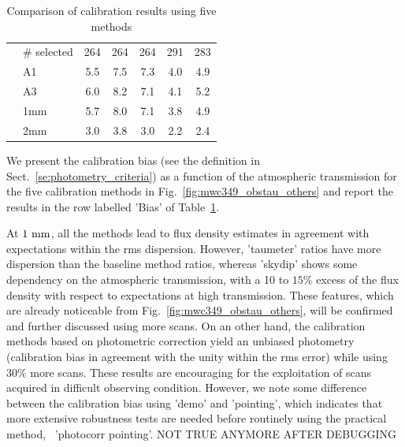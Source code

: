 \begin{table}[th]
\begin{center}
\begin{tabular}{|c|l|c|c|c|c|c|}
       &  $\#$ selected &   264    &    264   &    264    &    291    &  283 \\
       &  A1            &   5.5    &    7.5   &    7.3    &    4.0    &  4.9 \\
       &  A3            &   6.0    &    8.2   &    7.1    &    4.1    &  5.2 \\
       &  1mm           &   5.7    &    8.0   &    7.1    &    3.8    &  4.9 \\
       &  2mm           &   3.0    &    3.8   &    3.0    &    2.2    &  2.4 \\
\hline\hline
\end{tabular}
\caption[Comparison of calibration results using five methods]{Comparison of calibration results using five methods}
\label{tab:Calibration_results_all}
\end{center}
\end{table}

We present the calibration bias (see the definition in
Sect.~\ref{se:photometry_criteria}) as a function of the atmospheric
transmission for the five calibration methods in
Fig.~\ref{fig:mwc349_obstau_others} and report the results in the row
labelled 'Bias' of Table~\ref{tab:Calibration_results_all}. 

At $1~\rm{mm}$, all the methods lead to flux density estimates in
agreement with expectations within the rms dispersion. However,
'taumeter' ratios have more dispersion than the baseline method
ratios, whereas 'skydip' shows some dependency on the atmospheric
transmission, with a 10 to $15\%$ excess of the flux density with
respect to expectations at high transmission. These features, which are
already noticeable from Fig.~\ref{fig:mwc349_obstau_others}, will be
confirmed and further discussed using more scans. On an other hand,
the calibration methods based on photometric correction yield an
unbiased photometry (calibration bias in agreement with the unity
within the rms error) while using $30\%$ more scans. These results are
encouraging for the exploitation of scans acquired in difficult
observing condition. {\color{magenta} However, we note some difference between the
calibration bias using 'demo' and 'pointing', which indicates that
more extensive robustness tests are needed before routinely using the
practical method, \aka\ 'photocorr pointing'. NOT TRUE ANYMORE AFTER DEBUGGING}   


